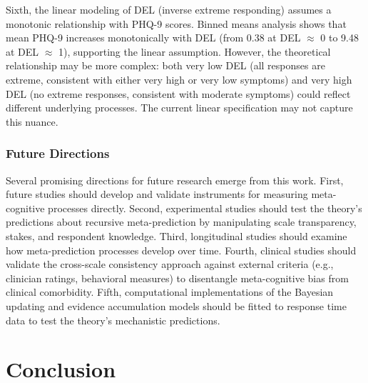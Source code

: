 \documentclass[10pt,twocolumn]{article}
\begin{document}
Sixth, the linear modeling of DEL (inverse extreme responding) assumes a monotonic relationship with PHQ-9 scores. Binned means analysis shows that mean PHQ-9 increases monotonically with DEL (from 0.38 at DEL $\approx$ 0 to 9.48 at DEL $\approx$ 1), supporting the linear assumption. However, the theoretical relationship may be more complex: both very low DEL (all responses are extreme, consistent with either very high or very low symptoms) and very high DEL (no extreme responses, consistent with moderate symptoms) could reflect different underlying processes. The current linear specification may not capture this nuance.

\subsubsection{Future Directions}

Several promising directions for future research emerge from this work. First, future studies should develop and validate instruments for measuring meta-cognitive processes directly. Second, experimental studies should test the theory's predictions about recursive meta-prediction by manipulating scale transparency, stakes, and respondent knowledge. Third, longitudinal studies should examine how meta-prediction processes develop over time. Fourth, clinical studies should validate the cross-scale consistency approach against external criteria (e.g., clinician ratings, behavioral measures) to disentangle meta-cognitive bias from clinical comorbidity. Fifth, computational implementations of the Bayesian updating and evidence accumulation models should be fitted to response time data to test the theory's mechanistic predictions.


\section{Conclusion}
\end{document}
